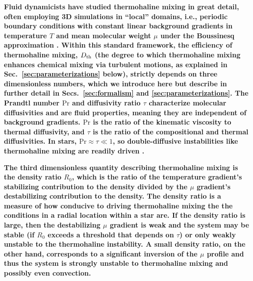 \textbf{Fluid dynamicists have studied thermohaline mixing in great detail, often employing 3D simulations in ``local'' domains, i.e., periodic boundary conditions with constant linear background gradients in temperature $T$ and mean molecular weight $\mu$ under the Boussinesq approximation \citep{spiegel_boussinesq_1960}. Within this standard framework, the efficiency of thermohaline mixing, $D_\mathrm{th}$ (the degree to which thermohaline mixing enhances chemical mixing via turbulent motions, as explained in Sec.~\ref{sec:parameterizations} below), strictly depends on three dimensionless numbers, which we introduce here but describe in further detail in Secs.~\ref{sec:formalism} and \ref{sec:parameterizations}. %
The Prandtl number $\mathrm{Pr}$ and diffusivity ratio $\tau$ characterize molecular diffusivities and are fluid properties, meaning they are independent of background gradients. %
$\mathrm{Pr}$ is the ratio of the kinematic viscosity to thermal diffusivity, and $\tau$ is the ratio of the compositional and thermal diffusivities. In stars, $\mathrm{Pr}\approx\tau \ll 1$, so double-diffusive instabilities like thermohaline mixing are readily driven \citep{garaud_DDC_review_2018}.} 

\textbf{The third dimensionless quantity describing thermohaline mixing is the density ratio $R_0$, which is the ratio of the temperature gradient's stabilizing contribution to the density divided by the $\mu$ gradient's destabilizing contribution to the density. The density ratio is a measure of how conducive to driving thermohaline mixing the the conditions in a radial location within a star are. %
If the density ratio is large, then the destabilizing $\mu$ gradient is weak and the system may be stable (if $R_0$ exceeds a threshold that depends on $\tau$) or only weakly unstable to the thermohaline instability. A small density ratio, on the other hand, corresponds to a significant inversion of the $\mu$ profile and thus the system is strongly unstable to thermohaline mixing and possibly even convection.} 

